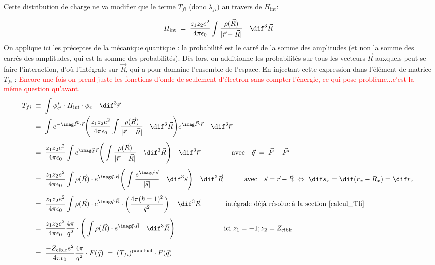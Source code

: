Cette distribution de charge ne va modifier que le terme $T_{fi}$ (donc $\lambda_{fi}$) au travers de $H_\text{int}$:

\[
    H_\text{int} \eq \dfrac{z_1z_2e^2}{4\pi\epsilon_0} \int \dfrac{\rho(\vec{R})}{|\vec{r} - \vec{R}|} \quad \dif^3\vec{R}
\] 
On applique ici les préceptes de la mécanique quantique : la probabilité est le carré de la somme des amplitudes (et non la somme des carrés des amplitudes, qui est la somme des probabilités). Dès lors, on additionne les probabilités sur tous les vecteurs $\vec{R}$ auxquels peut se faire l'interaction, d'où l'intégrale sur $\vec{R}$, qui a pour domaine l'ensemble de l'espace. En injectant cette expression dans l'élément de matrice $T_{fi}$ : \textcolor{red}{Encore une fois on prend juste les fonctions d'onde de seulement d'électron sans compter l'énergie, ce qui pose problème...c'est la même question qu'avant.}
\begin{align*}
    T_{fi} 
&\; \equiv \;
    \int \phi^*_{e'} \cdot H_\text{int} \cdot \phi_e \quad \dif^3\vec{r}\\
&\eq 
    \int 
    e^{-\imag\vec{P'} \cdot\vec{r}}
    \Bigg(
        \dfrac{z_1z_2e^2}{4\pi\epsilon_0} \int \dfrac{\rho(\vec{R})}{|\vec{r} - \vec{R}|} \quad \dif^3\vec{R}
    \Bigg)
    e^{\imag\vec{P} \cdot\vec{r}}
    \quad \dif^3\vec{r}\\[4pt]
& \eq 
    \dfrac{z_1z_2e^2}{4\pi\epsilon_0} \int 
    e^{\imag\vec{q} \cdot\vec{r}}
    \Bigg(
         \int \dfrac{\rho(\vec{R})}{|\vec{r} - \vec{R}|} \quad \dif^3\vec{R}
    \Bigg)
    \quad \dif^3\vec{r}
    \qquad \qquad \;\; \text{avec} \quad \vec{q} \eq \vec{P}-\vec{P'}
    \\[4pt]
& \eq 
    \dfrac{z_1z_2e^2}{4\pi\epsilon_0} \int 
    \rho(\vec{R}) \cdot e^{\imag\vec{q} \cdot\vec{R}}
    \Bigg(
         \int \dfrac{ e^{\imag\vec{q} \cdot\vec{s}}   }{|\vec{s}|} \quad \dif^3\vec{s}
    \Bigg)
    \quad \dif^3\vec{R}
    \qquad \quad \text{avec} \quad \vec{s} = \vec{r}-\vec{R} \; \Leftrightarrow \; \dif s_x = \dif(r_x - R_x) = \dif r_x
    \\[4pt]
& \eq 
    \dfrac{z_1z_2e^2}{4\pi\epsilon_0} \int 
    \rho(\vec{R}) \cdot e^{\imag\vec{q} \cdot\vec{R}}
    \cdot \left( \dfrac{4\pi(\hbar = 1)^2}{q^2} \right)
    \quad \dif^3\vec{R}
    \qquad \quad \;\; \text{intégrale déjà résolue à la section \eqref{calcul_Tfi}}
    \\[4pt]
& \eq 
    \dfrac{z_1z_2e^2}{4\pi\epsilon_0} \dfrac{4\pi}{q^2} \cdot
    \Bigg(
    \int 
    \rho(\vec{R}) \cdot e^{\imag\vec{q} \cdot\vec{R}}
    \quad \dif^3\vec{R}
    \Bigg)
    \qquad \qquad \qquad \quad \text{ici  }  z_1 = -1; z_2 = Z_\text{cible}
    \\[4pt]
& \eq 
    \dfrac{-Z_\text{cible}e^2}{4\pi\epsilon_0} \dfrac{4\pi}{q^2}
    \cdot F(\vec{q})
    \eq
    (T_{fi})^\text{ponctuel} \cdot F(\vec{q})
    \\
\end{align*}
